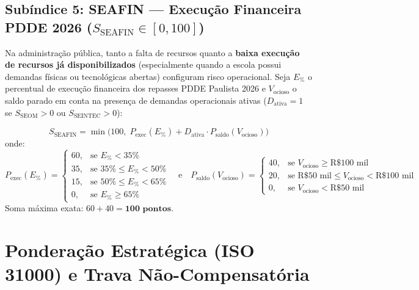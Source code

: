 \documentclass[9pt,a4paper]{extarticle}
\begin{document}
\subsection{Subíndice 5: SEAFIN --- Execução Financeira PDDE 2026 ($S_{\text{SEAFIN}} \in [0, 100]$)}

Na administração pública, tanto a falta de recursos quanto a \textbf{baixa execução de recursos já disponibilizados} (especialmente quando a escola possui demandas físicas ou tecnológicas abertas) configuram risco operacional. Seja $E_{\%}$ o percentual de execução financeira dos repasses PDDE Paulista 2026 e $V_{\text{ocioso}}$ o saldo parado em conta na presença de demandas operacionais ativas ($D_{\text{ativa}} = 1$ se $S_{\text{SEOM}} > 0$ ou $S_{\text{SEINTEC}} > 0$):

\begin{equation}
S_{\text{SEAFIN}} = \min\Big(100, \; P_{\text{exec}}(E_{\%}) + D_{\text{ativa}} \cdot P_{\text{saldo}}(V_{\text{ocioso}})\Big)
\end{equation}
onde:
\begin{equation}
P_{\text{exec}}(E_{\%}) = \begin{cases} 60, & \text{se } E_{\%} < 35\% \\ 35, & \text{se } 35\% \le E_{\%} < 50\% \\ 15, & \text{se } 50\% \le E_{\%} < 65\% \\ 0, & \text{se } E_{\%} \ge 65\% \end{cases}
\quad \text{e} \quad
P_{\text{saldo}}(V_{\text{ocioso}}) = \begin{cases} 40, & \text{se } V_{\text{ocioso}} \ge \text{R\$ } 100\text{ mil} \\ 20, & \text{se } \text{R\$ } 50\text{ mil} \le V_{\text{ocioso}} < \text{R\$ } 100\text{ mil} \\ 0, & \text{se } V_{\text{ocioso}} < \text{R\$ } 50\text{ mil} \end{cases}
\end{equation}
Soma máxima exata: $60 + 40 = \mathbf{100\text{ pontos}}$.

\section{Ponderação Estratégica (ISO 31000) e Trava Não-Compensatória}
\end{document}
